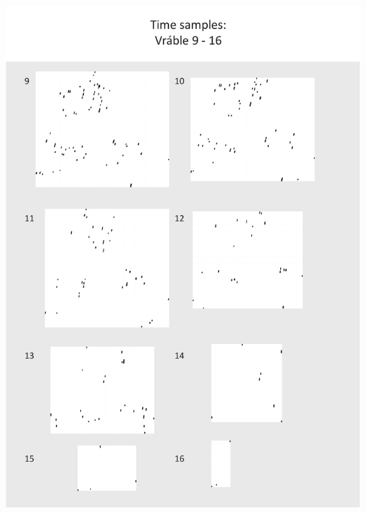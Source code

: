 \documentclass[
  12pt,
  a4paper, twoside]{book}
\begin{document}
\begin{center}\includegraphics[width=1\linewidth]{Appendix/time_2} \end{center}

\newpage
\end{document}
